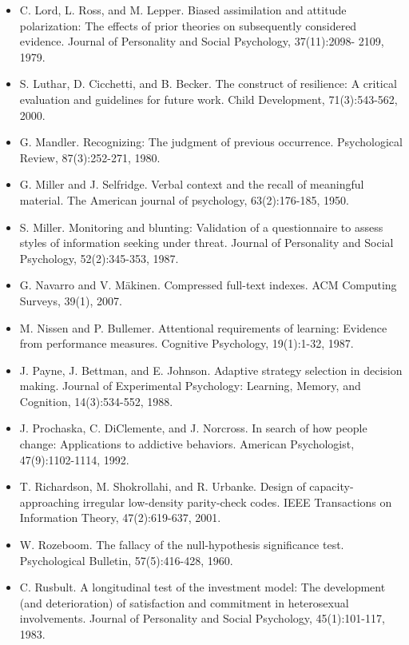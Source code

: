 \documentclass[10pt,letterpaper]{article}
\begin{document}
\begin{itemize}
\item C. Lord, L. Ross, and M. Lepper. Biased assimilation and attitude polarization: The effects of prior theories on subsequently considered evidence. Journal of Personality and Social Psychology, 37(11):2098- 2109, 1979. %
\item S. Luthar, D. Cicchetti, and B. Becker. The construct of resilience: A critical evaluation and guidelines for future work. Child Development, 71(3):543-562, 2000. %
\item G. Mandler. Recognizing: The judgment of previous occurrence. Psychological Review, 87(3):252-271, 1980. %
\item G. Miller and J. Selfridge. Verbal context and the recall of meaningful material. The American journal of psychology, 63(2):176-185, 1950. %
\item S. Miller. Monitoring and blunting: Validation of a questionnaire to assess styles of information seeking under threat. Journal of Personality and Social Psychology, 52(2):345-353, 1987. %
\item G. Navarro and V. M\"{a}kinen. Compressed full-text indexes. ACM Computing Surveys, 39(1), 2007. %
\item M. Nissen and P. Bullemer. Attentional requirements of learning: Evidence from performance measures. Cognitive Psychology, 19(1):1-32, 1987. %
\item J. Payne, J. Bettman, and E. Johnson. Adaptive strategy selection in decision making. Journal of Experimental Psychology: Learning, Memory, and Cognition, 14(3):534-552, 1988. %
\item J. Prochaska, C. DiClemente, and J. Norcross. In search of how people change: Applications to addictive behaviors. American Psychologist, 47(9):1102-1114, 1992. %
\item T. Richardson, M. Shokrollahi, and R. Urbanke. Design of capacity-approaching irregular low-density parity-check codes. IEEE Transactions on Information Theory, 47(2):619-637, 2001. %
\item W. Rozeboom. The fallacy of the null-hypothesis significance test. Psychological Bulletin, 57(5):416-428, 1960. %
\item C. Rusbult. A longitudinal test of the investment model: The development (and deterioration) of satisfaction and commitment in heterosexual involvements. Journal of Personality and Social Psychology, 45(1):101-117, 1983. %

\end{itemize}
\end{document}

